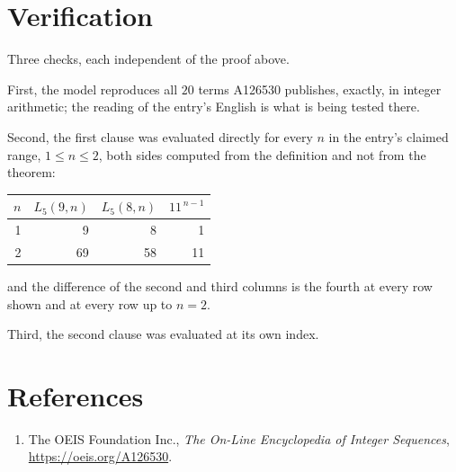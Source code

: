 \documentclass[11pt,a4paper]{article}
\theoremstyle{plain}
\theoremstyle{definition}
\begin{document}
\section{Verification}

Three checks, each independent of the proof above.

First, the model reproduces all $20$ terms A126530 publishes, exactly, in integer
arithmetic; the reading of the entry's English is what is being tested there.

Second, the first clause was evaluated directly for every $n$ in the entry's claimed range,
$1\le n\le2$, both sides computed from the definition and not from the theorem:

\begin{center}
\begin{tabular}{rrrr}
$n$ & $L_{5}(9,n)$ & $L_{5}(8,n)$ & $11^{\,n-1}$ \\ \hline
1 & 9 & 8 & 1 \\
2 & 69 & 58 & 11 \\
\end{tabular}
\end{center}

\noindent and the difference of the second and third columns is the fourth at every row shown
and at every row up to $n=2$.

Third, the second clause was evaluated at its own index.

\section*{References}
\begin{enumerate}
\item The OEIS Foundation Inc., \emph{The On-Line Encyclopedia of Integer Sequences},
\url{https://oeis.org/A126530}.
\end{enumerate}
\end{document}
